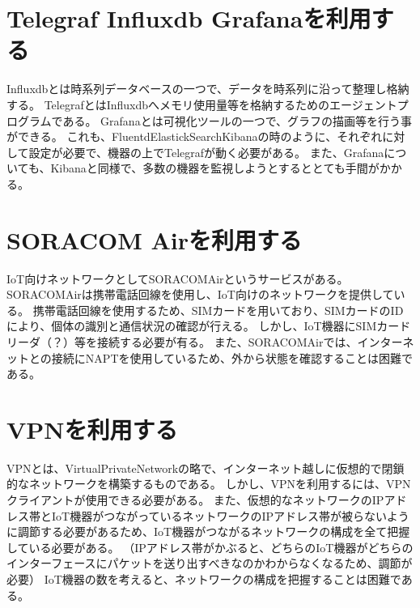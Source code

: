 \section{Telegraf Influxdb Grafanaを利用する}
Influxdbとは時系列データベースの一つで、データを時系列に沿って整理し格納する。
TelegrafとはInfluxdbへメモリ使用量等を格納するためのエージェントプログラムである。
Grafanaとは可視化ツールの一つで、グラフの描画等を行う事ができる。
これも、FluentdElastickSearchKibanaの時のように、それぞれに対して設定が必要で、機器の上でTelegrafが動く必要がある。
また、Grafanaについても、Kibanaと同様で、多数の機器を監視しようとするととても手間がかかる。

\section{SORACOM Airを利用する}
IoT向けネットワークとしてSORACOMAirというサービスがある。
SORACOMAirは携帯電話回線を使用し、IoT向けのネットワークを提供している。
携帯電話回線を使用するため、SIMカードを用いており、SIMカードのIDにより、個体の識別と通信状況の確認が行える。
しかし、IoT機器にSIMカードリーダ（？）等を接続する必要が有る。
また、SORACOMAirでは、インターネットとの接続にNAPTを使用しているため、外から状態を確認することは困難である。

\section{VPNを利用する}
VPNとは、VirtualPrivateNetworkの略で、インターネット越しに仮想的で閉鎖的なネットワークを構築するものである。
しかし、VPNを利用するには、VPNクライアントが使用できる必要がある。
また、仮想的なネットワークのIPアドレス帯とIoT機器がつながっているネットワークのIPアドレス帯が被らないように調節する必要があるため、IoT機器がつながるネットワークの構成を全て把握している必要がある。
（IPアドレス帯がかぶると、どちらのIoT機器がどちらのインターフェースにパケットを送り出すべきなのかわからなくなるため、調節が必要）
IoT機器の数を考えると、ネットワークの構成を把握することは困難である。



